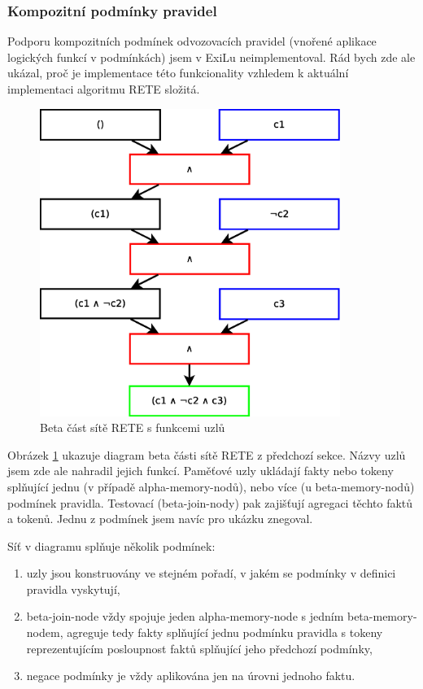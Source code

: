 \subsubsection{Kompozitní podmínky pravidel}

Podporu kompozitních podmínek odvozovacích pravidel (vnořené aplikace logických
funkcí v podmínkách) jsem v ExiLu neimplementoval. Rád bych zde ale ukázal, proč
je implementace této funkcionality vzhledem k aktuální implementaci algoritmu
RETE složitá.

\begin{figure}[h]
\centering
\includegraphics[height=10cm]{rete-beta-conds.eps}
\caption{Beta část sítě RETE s funkcemi uzlů}
\label{rete-beta-conds}
\end{figure}

Obrázek \ref{rete-beta-conds} ukazuje diagram beta části sítě RETE z předchozí sekce. Názvy uzlů
jsem zde ale nahradil jejich funkcí. Paměťové uzly ukládají fakty nebo tokeny
splňující jednu (v případě alpha-memory-nodů), nebo více (u beta-memory-nodů)
podmínek pravidla. Testovací (beta-join-nody) pak zajišťují agregaci těchto
faktů a tokenů. Jednu z podmínek jsem navíc pro ukázku znegoval.

Síť v diagramu splňuje několik podmínek:
\begin{enumerate}
  \item uzly jsou konstruovány ve stejném pořadí, v jakém se podmínky v definici
    pravidla vyskytují,
  \item beta-join-node vždy spojuje jeden alpha-memory-node s jedním
    beta-memory-nodem, agreguje tedy fakty splňující jednu podmínku pravidla s
    tokeny reprezentujícím posloupnost faktů splňující jeho předchozí podmínky,
  \item negace podmínky je vždy aplikována jen na úrovni jednoho faktu.
\end{enumerate}

